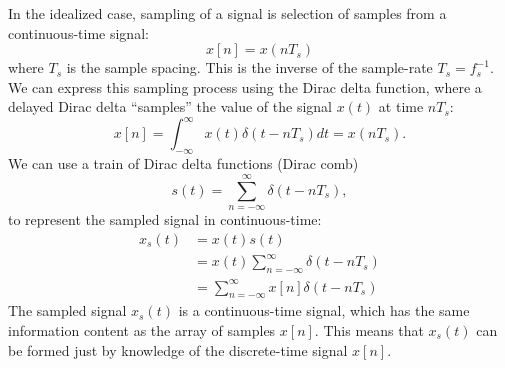 In the idealized case, sampling of a signal is selection of samples from a continuous-time signal:
\begin{equation}
x[n] = x(nT_s)
\end{equation}
where $T_s$ is the sample spacing. This is the inverse of the sample-rate $T_s = f_s^{-1}$.  We can express this sampling process using the Dirac delta function, where a delayed Dirac delta ``samples'' the value of the signal $x(t)$ at time $nT_s$:
\begin{equation}
x[n] = \int_{-\infty}^{\infty}x(t)\delta(t-nT_s)dt = x(nT_s).
\end{equation}
We can use a train of Dirac delta functions (Dirac comb) 
\begin{equation}
s(t) = \sum_{n=-\infty}^{\infty}\delta(t-nT_s),
\end{equation}
to represent the sampled signal in continuous-time:
\begin{align}
x_s(t) &= x(t) s(t) \\
       &= x(t) \sum_{n=-\infty}^{\infty} \delta(t-nT_s) \\
       &= \sum_{n=-\infty}^{\infty} x[n]\delta(t-nT_s)
\end{align}
The sampled signal $x_s(t)$ is a continuous-time signal, which has the same information content as the array of samples $x[n]$. This means that $x_s(t)$ can be formed just by knowledge of the discrete-time signal $x[n]$.


